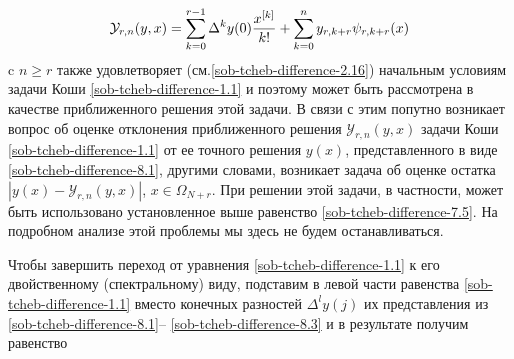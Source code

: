 \begin{equation}\label{sob-tcheb-difference-8.5}
 \mathcal{Y}_{r,n}(y,x)= \sum_{k=0}^{r-1}\Delta^ky(0){x^{[k]}\over k!} +\sum_{k=0}^ny_{r,k+r} \psi_{r,k+r}(x)
  \end{equation}
c $n\ge r$ также удовлетворяет (см.\eqref{sob-tcheb-difference-2.16}) начальным условиям задачи Коши \eqref{sob-tcheb-difference-1.1} и поэтому может быть рассмотрена в качестве приближенного решения этой задачи. В связи с этим попутно возникает вопрос об оценке отклонения приближенного решения $\mathcal{Y}_{r,n}(y,x)$ задачи Коши \eqref{sob-tcheb-difference-1.1} от ее точного решения $y(x)$, представленного в виде \eqref{sob-tcheb-difference-8.1}, другими словами, возникает задача об оценке остатка $|y(x)-\mathcal{Y}_{r,n}(y,x)|$, $x \in \Omega_{N+r}$. При решении этой задачи, в частности, может быть использовано установленное выше равенство \eqref{sob-tcheb-difference-7.5}. На подробном анализе этой проблемы мы здесь не будем останавливаться.

Чтобы завершить переход от уравнения  \eqref{sob-tcheb-difference-1.1} к его двойственному (спектральному) виду,
подставим в левой части равенства \eqref{sob-tcheb-difference-1.1} вместо конечных разностей $\Delta^l y(j)$
их представления из \eqref{sob-tcheb-difference-8.1}-- \eqref{sob-tcheb-difference-8.3} и в результате получим равенство


